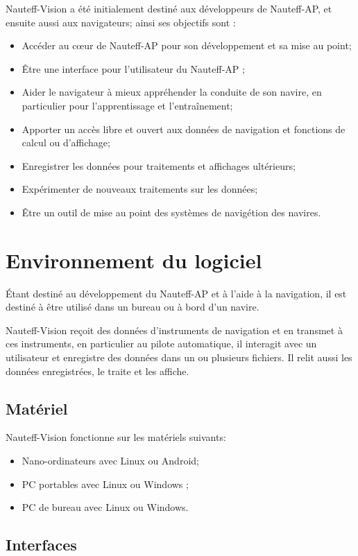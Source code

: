 \documentclass[a4paper,11pt]{report}
\begin{document}
Nauteff-Vision a été initialement destiné aux développeurs de Nauteff-AP,
et ensuite aussi aux navigateurs; ainsi ses objectifs sont :
\begin{itemize}
	\item Accéder au cœur de Nauteff-AP pour son développement et sa mise au point;
	\item Être une interface pour l'utilisateur du Nauteff-AP ;
	\item Aider le navigateur à mieux appréhender la conduite de son navire, en particulier pour l'apprentissage et l'entraînement;
	\item Apporter un accès libre et ouvert aux données de navigation et fonctions de calcul ou d'affichage;
	\item Enregistrer les données pour traitements et affichages ultérieurs;
	\item Expérimenter de nouveaux traitements sur les données;
	\item Être un outil de mise au point des systèmes de navigétion des navires.
\end{itemize}

\section{Environnement du logiciel}

Étant destiné au développement du Nauteff-AP et à l'aide à la navigation,
il est destiné à être utilisé dans un bureau ou à bord d'un navire.


Nauteff-Vision reçoit des données d'instruments de navigation et en transmet à ces instruments, en particulier au pilote automatique, il interagit avec un utilisateur et
enregistre des données dans un ou plusieurs fichiers.
Il relit aussi les données enregistrées, le traite et les affiche.

\subsection{Matériel}

Nauteff-Vision fonctionne sur les matériels suivants:
\begin{itemize}
	\item Nano-ordinateurs avec Linux ou Android;
    \item PC portables avec Linux ou Windows ;
    \item PC de bureau avec Linux ou Windows.
\end{itemize}

\subsection{Interfaces}
\end{document}
